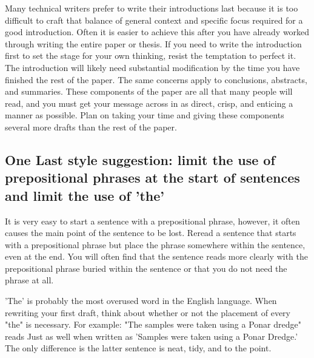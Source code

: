 \documentclass[11pt]{article}
\begin{document}
Many technical writers prefer to write their introductions last because it is too difficult to craft that balance of general context and specific focus required for a good introduction. Often it is easier to achieve this after you have already worked through writing the entire paper or thesis. If you need to write the introduction first to set the stage for your own thinking, resist the temptation to perfect it. The introduction will likely need substantial modification by the time you have finished the rest of the paper. The same concerns apply to conclusions, abstracts, and summaries. These components of the paper are all that many people will read, and you must get your message across in as direct, crisp, and enticing a manner as possible. Plan on taking your time and giving these components several more drafts than the rest of the paper.

\subsection{One Last style suggestion: limit the use of prepositional phrases at the start of sentences and limit the use of 'the'}

It is very easy to start a sentence with a prepositional phrase, however, it often causes the main point of the sentence to be lost. Reread a sentence that starts with a prepositional phrase but place the phrase somewhere within the sentence, even at the end. You will often find that the sentence reads more clearly with the prepositional phrase buried within the sentence or that you do not need the phrase at all.

'The' is probably the most overused word in the English language. When rewriting your first draft, think about whether or not the placement of every "the" is necessary. For example: "The samples were taken using a Ponar dredge" reads Just as well when written as 'Samples were taken using a Ponar Dredge.' The only difference is the latter sentence is neat, tidy, and to the point.
\end{document}
